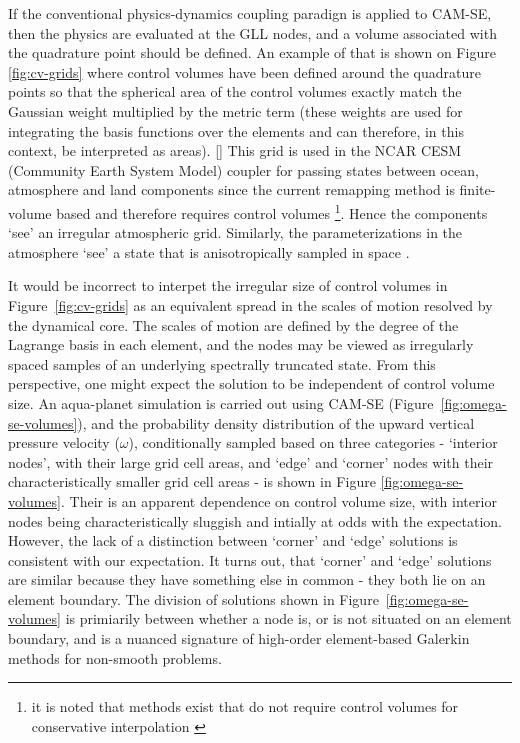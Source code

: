 \documentclass[twocol]{ametsoc}
\begin{document}
If the conventional physics-dynamics coupling paradign is applied to CAM-SE, then the physics are evaluated at the GLL nodes, and a volume associated with the quadrature point should be defined. An example of that is shown on Figure \ref{fig:cv-grids} where control volumes have been defined around the quadrature points so that the spherical area of the control volumes exactly match the Gaussian weight multiplied by the metric term (these weights are used for integrating the basis functions over the elements and can therefore, in this context, be interpreted as areas). [{\color{red}{Mark: could we be mathematically more rigorous? perhaps an appendix describing the iterative algorithm?}}] This grid is used in the NCAR CESM (Community Earth System Model) coupler for passing states between ocean, atmosphere and land components since the current remapping method is finite-volume based and therefore requires control volumes {\footnote{it is noted that methods exist that do not require control volumes for conservative interpolation \citep{UT2015MWR}}}. Hence the components `see' an irregular atmospheric grid. Similarly, the parameterizations in the atmosphere `see' a state that is anisotropically sampled in space \citep[see Figure 1 and 5 in ][]{KetAl2008JGR}.%

It would be incorrect to interpet the irregular size of control volumes in Figure~\ref{fig:cv-grids} as an equivalent spread in the scales of motion resolved by the dynamical core. The scales of motion are defined by the degree of the Lagrange basis in each element, and the nodes may be viewed as irregularly spaced samples of an underlying spectrally truncated state. From this perspective, one might expect the solution to be independent of control volume size. An aqua-planet simulation \citep{NH2000ASL,MWO2016JAMES} is carried out using CAM-SE (Figure~\ref{fig:omega-se-volumes}), and the probability density distribution of the upward vertical pressure velocity ($\omega$), conditionally sampled based on three categories - `interior nodes', with their large grid cell areas, and `edge' and `corner' nodes with their characteristically smaller grid cell areas - is shown in Figure \ref{fig:omega-se-volumes}. Their is an apparent dependence on control volume size, with interior nodes being characteristically sluggish and intially at odds with the expectation. However, the lack of a distinction between `corner' and `edge' solutions is consistent with our expectation. It turns out, that `corner' and `edge' solutions are similar because they have something else in common - they both lie on an element boundary. The division of solutions shown in Figure~\ref{fig:omega-se-volumes} is primiarily between whether a node is, or is not situated on an element boundary, and is a nuanced signature of high-order element-based Galerkin methods for non-smooth problems.
\end{document}
